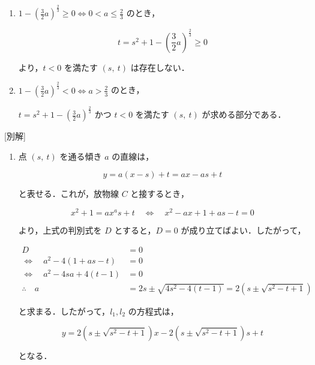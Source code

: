 \documentclass[a4paper]{ltjsarticle}
\begin{document}
\begin{enumerate}[label=(\arabic*)]
          \begin{enumerate}[label=(\roman*)]
              \item $1-\left(\frac{3}{2}a\right)^{\frac{2}{3}}\geq 0\Longleftrightarrow 0<a\leq\frac{2}{3}$ のとき，

                    \begin{equation*}
                        t=s^2+1-\left(\frac{3}{2}a\right)^{\frac{2}{3}}\geq 0
                    \end{equation*}

                    より，$t<0$ を満たす $(s,\ t)$ は存在しない．
              \item $1-\left(\frac{3}{2}a\right)^{\frac{2}{3}}<0\Longleftrightarrow a>\frac{2}{3}$ のとき，

                    $t=s^2+1-\left(\frac{3}{2}a\right)^{\frac{2}{3}}$ かつ $t<0$ を満たす $(s,\ t)$ が求める部分である．
          \end{enumerate}
\end{enumerate}

[別解]

\begin{enumerate}[label=(\arabic*)]
    \item 点 $(s,\ t)$ を通る傾き $a$ の直線は，

          \begin{equation*}
              y=a(x-s)+t=ax-as+t
          \end{equation*}

          と表せる．これが，放物線 $C$ と接するとき，

          \begin{equation*}
              x^2+1=ax^as+t\quad\Longleftrightarrow\quad x^2-ax+1+as-t=0
          \end{equation*}

          より，上式の判別式を $D$ とすると，$D=0$ が成り立てばよい．したがって，

          \begin{align*}
              D                                       & =0                                             \\
              \Longleftrightarrow\quad a^2-4(1+as-t)  & =0                                             \\
              \Longleftrightarrow\quad a^2-4sa+4(t-1) & =0                                             \\
              \therefore\quad a                       & =2s\pm\sqrt{4s^2-4(t-1)}=2(s\pm\sqrt{s^2-t+1})
          \end{align*}

          と求まる．したがって，$l_1, l_2$ の方程式は，

          \begin{equation*}
              y=2(s\pm\sqrt{s^2-t+1})x-2(s\pm\sqrt{s^2-t+1})s+t
          \end{equation*}

          となる．
\end{enumerate}

\end{document}
